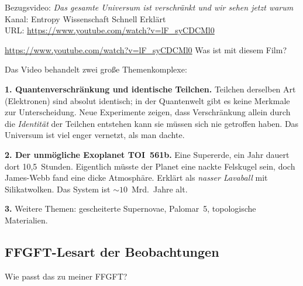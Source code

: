 \begin{videobox}
Bezugsvideo: \emph{Das gesamte Universum ist verschr\"ankt \textendash{} und wir sehen jetzt warum} \\
Kanal: Entropy \textendash{} Wissenschaft Schnell Erkl\"art \\
URL: \url{https://www.youtube.com/watch?v=lF_syCDCMl0}
\end{videobox}

\begin{userbox}
\url{https://www.youtube.com/watch?v=lF_syCDCMl0} \quad Was ist mit diesem Film?
\end{userbox}

\begin{geminibox}
Das Video behandelt zwei gro{\ss}e Themenkomplexe:

\textbf{1. Quantenverschr\"ankung und identische Teilchen.} Teilchen derselben Art (Elektronen) sind absolut identisch; in der Quantenwelt gibt es keine Merkmale zur Unterscheidung. Neue Experimente zeigen, dass Verschr\"ankung allein durch die \emph{Identit\"at} der Teilchen entstehen kann \textendash{} sie m\"ussen sich nie getroffen haben. Das Universum ist viel enger vernetzt, als man dachte.

\textbf{2. Der \glqq unm\"ogliche\grqq{} Exoplanet TOI~561b.} Eine Supererde, ein Jahr dauert dort 10{,}5~Stunden. Eigentlich m\"usste der Planet eine nackte Felskugel sein, doch James-Webb fand eine dicke Atmosph\"are. Erkl\"art als \emph{nasser Lavaball} mit Silikatwolken. Das System ist $\sim 10$~Mrd.~Jahre alt.

\textbf{3.} Weitere Themen: gescheiterte Supernovae, Palomar~5, topologische Materialien.
\end{geminibox}

\subsection{FFGFT-Lesart der Beobachtungen}

\begin{userbox}
Wie passt das zu meiner FFGFT?
\end{userbox}

